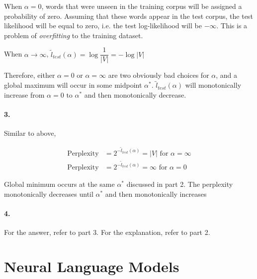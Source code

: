 \documentclass[10pt,letter]{article}
\begin{document}
When $\alpha=0$, words that were unseen in the training corpus will be assigned a probability of zero. Assuming that these words appear in the test corpus, the test likelihood will be equal to zero, i.e. the test log-likelihood will be $-\infty$. This is a problem of \textit{overfitting} to the training dataset. 

When $\alpha\rightarrow\infty$, $\tilde{l}_{test}(\alpha)=\log\dfrac{1}{|V|}=-\log|V|$ 

Therefore, either $\alpha = 0$ or $\alpha=\infty$  are two obviously bad choices for $\alpha$, and a global maximum will occur in some midpoint $\alpha^*$. $\tilde{l}_{test}(\alpha)$ will monotonically increase from $\alpha = 0 \text{ to } \alpha^*$ and then monotonically decrease.

\paragraph*{3.}

Similar to above, 

\begin{align*}
\text{Perplexity} &= 2^{-\tilde{l}_{test}(\alpha)} = |V| \text{ for $\alpha = \infty$} \\
\text{Perplexity} &= 2^{-\tilde{l}_{test}(\alpha)} = \infty \text{ for $\alpha = 0$}
\end{align*}

Global minimum occurs at the same $\alpha^*$ discussed in part 2. The perplexity monotonically decreases until $\alpha^*$ and then monotonically increases

\paragraph*{4.}

For the answer, refer to part 3. For the explanation, refer to part 2. 


\section*{Neural Language Models}
\end{document}
